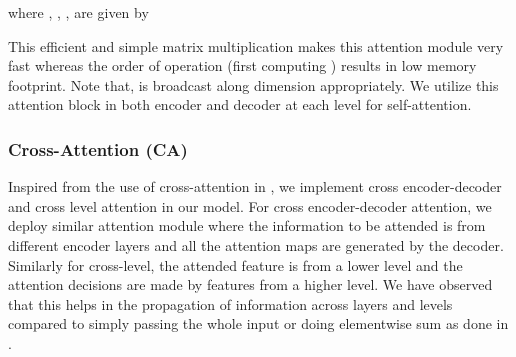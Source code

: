 \documentclass[10pt,twocolumn,letterpaper]{article}
\begin{document}
 
where , , ,  are given by

This efficient and simple matrix multiplication makes this attention module very fast whereas the order of operation (first computing ) results in low memory footprint. Note that,  is broadcast along  dimension appropriately. We utilize this attention block in both encoder and decoder at each level for self-attention.
\subsubsection{Cross-Attention (CA)}
Inspired from the use of cross-attention in \cite{vaswani2017attention}, we implement cross encoder-decoder and cross level attention in our model. For cross encoder-decoder attention, we deploy similar attention module where the information to be attended is from different encoder layers and all the attention maps are generated by the decoder. Similarly for cross-level, the attended feature is from a lower level and the attention decisions are made by features from a higher level. We have observed that this helps in the propagation of information across layers and levels compared to simply passing the whole input or doing elementwise sum as done in \cite{zhang2019deep}. 
\end{document}
